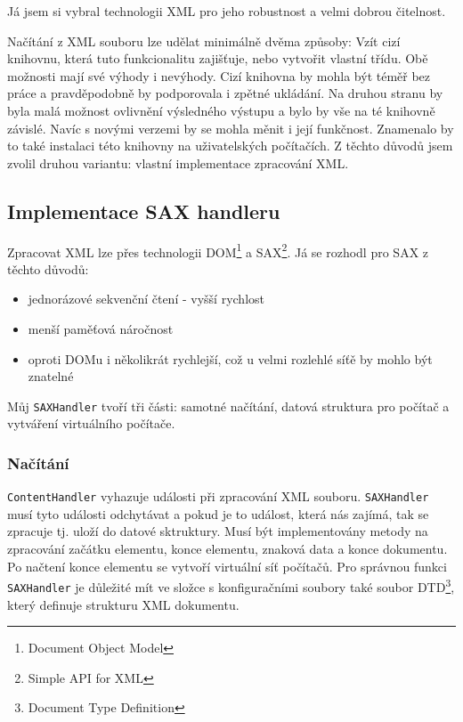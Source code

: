 Já jsem si vybral technologii XML pro jeho robustnost a velmi dobrou čitelnost.

Načítání z XML souboru lze udělat minimálně dvěma způsoby: Vzít cizí knihovnu, která tuto funkcionalitu zajišťuje, nebo vytvořit vlastní třídu. Obě možnosti mají své výhody i nevýhody. Cizí knihovna by mohla být téměř bez práce a pravděpodobně by podporovala i zpětné ukládání. Na druhou stranu by byla malá možnost ovlivnění výsledného výstupu a bylo by vše na té knihovně závislé. Navíc s novými verzemi by se mohla měnit i její funkčnost. Znamenalo by to také instalaci této knihovny na uživatelských počítačích. Z těchto důvodů jsem zvolil druhou variantu: vlastní implementace zpracování XML. 


\subsection{Implementace SAX handleru}
Zpracovat XML lze přes technologii DOM\footnote{Document Object Model} a SAX\footnote{Simple API for XML}. Já se rozhodl pro SAX z těchto důvodů:
\begin{itemize}
 \item jednorázové sekvenční čtení - vyšší rychlost
 \item menší paměťová náročnost
 \item oproti DOMu i několikrát rychlejší, což u velmi rozlehlé síťě by mohlo být znatelné
\end{itemize}

Můj \verb|SAXHandler| tvoří tři části: samotné načítání, datová struktura pro počítač a vytváření virtuálního počítače.

\subsubsection{Načítání}
\verb|ContentHandler| vyhazuje události při zpracování XML souboru. \verb|SAXHandler| musí tyto události odchytávat a pokud je to událost, která nás zajímá, tak se zpracuje tj. uloží do datové sktruktury. Musí být implementovány metody na zpracování začátku elementu, konce elementu, znaková data a konce dokumentu. Po načtení konce elementu se vytvoří virtuální síť počítačů. Pro správnou funkci \verb|SAXHandler| je důležité mít ve složce s konfiguračními soubory také soubor DTD\footnote{Document Type Definition}, který definuje strukturu XML dokumentu.

